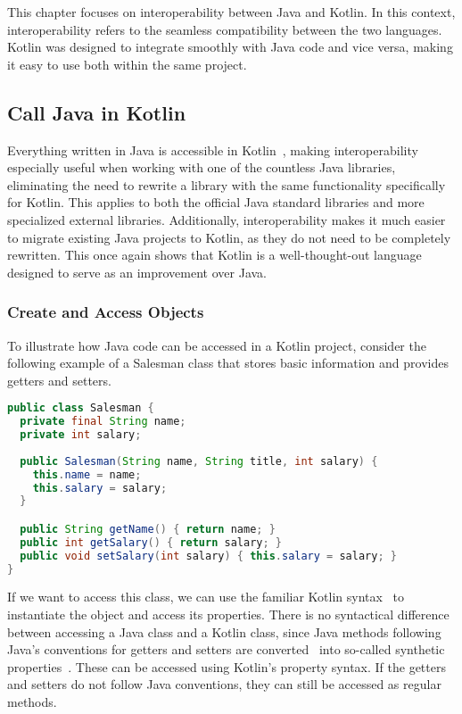 \documentclass[a4paper,11pt]{article}
\begin{document}
This chapter focuses on interoperability between Java and Kotlin. In this context, interoperability refers to the seamless compatibility between the two languages. Kotlin was designed to integrate smoothly with Java code and vice versa, making it easy to use both within the same project.

\subsection{Call Java in Kotlin}
Everything written in Java is accessible in Kotlin~\cite{interop}, making interoperability especially useful when working with one of the countless Java libraries, eliminating the need to rewrite a library with the same functionality specifically for Kotlin. This applies to both the official Java standard libraries and more specialized external libraries. Additionally, interoperability makes it much easier to migrate existing Java projects to Kotlin, as they do not need to be completely rewritten. This once again shows that Kotlin is a well-thought-out language designed to serve as an improvement over Java.

\subsubsection{Create and Access Objects}
To illustrate how Java code can be accessed in a Kotlin project, consider the following example of a Salesman class that stores basic information and provides getters and setters.
\begin{lstlisting}[language=Java,title={Example Java class}]
public class Salesman {
  private final String name;
  private int salary;
  
  public Salesman(String name, String title, int salary) {
    this.name = name;
    this.salary = salary;
  }

  public String getName() { return name; }
  public int getSalary() { return salary; }
  public void setSalary(int salary) { this.salary = salary; }
}
\end{lstlisting}

If we want to access this class, we can use the familiar Kotlin syntax~\cite{interop} to instantiate the object and access its properties. There is no syntactical difference between accessing a Java class and a Kotlin class, since Java methods following Java's conventions for getters and setters are converted~\cite{interop-getter-setter} into so-called synthetic properties~\cite{interop-synthetic-property}. These can be accessed using Kotlin's property syntax. If the getters and setters do not follow Java conventions, they can still be accessed as regular methods.
\end{document}
